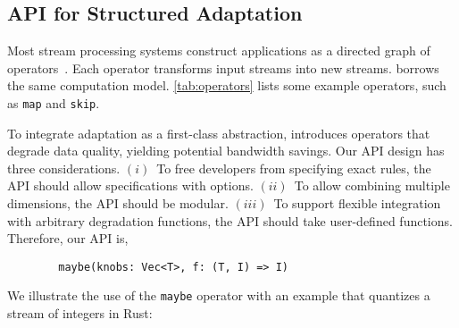 \subsection{API for Structured Adaptation}
\label{sec:structure-adapt}

Most stream processing systems construct applications as a directed graph of
operators~\cite{toshniwal2014storm, zaharia2013discretized}. Each operator
transforms input streams into new streams. \sysname{} borrows the same
computation model.  \autoref{tab:operators} lists some example operators, such
as \texttt{map} and \texttt{skip}.

To integrate adaptation as a first-class abstraction, \sysname{} introduces
\maybe{} operators that degrade data quality, yielding potential bandwidth
savings.  Our API design has three considerations. $(i)$~To free developers from
specifying exact rules, the API should allow specifications with
options. $(ii)$~To allow combining multiple dimensions, the API should be
modular. $(iii)$~To support flexible integration with arbitrary degradation
functions, the API should take user-defined functions. Therefore, our API is,

\vspace{-2pt}
\begin{lstlisting}
        maybe(knobs: Vec<T>, f: (T, I) => I)
\end{lstlisting}

We illustrate the use of the \texttt{maybe} operator with an example that
quantizes a stream of integers in Rust:

